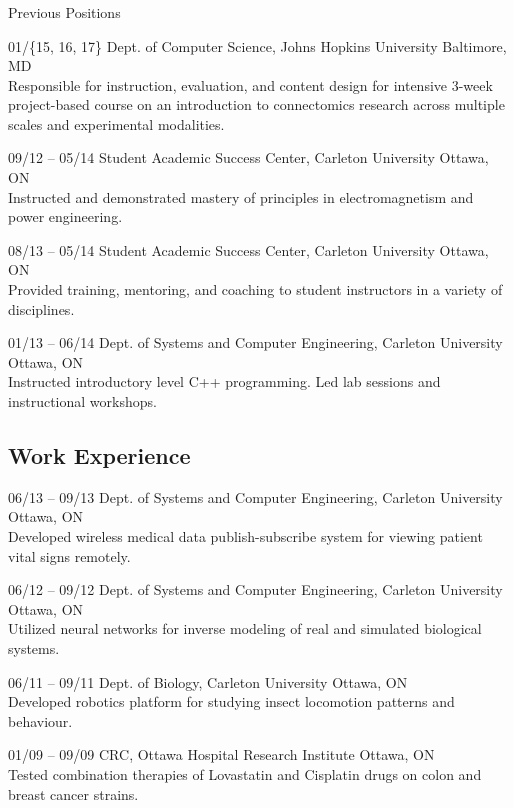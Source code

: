 \documentclass[]{friggeri-cv} %
\begin{document}
\subsubsection{}{Previous Positions}

\begin{entrylist}
\entry
{01/\{15, 16, 17\}}
{Dept. of Computer Science, Johns Hopkins University}
{Baltimore, MD}
{\\
Responsible for instruction, evaluation, and content design for intensive 3-week project-based course
on an introduction to connectomics research across multiple scales and experimental modalities.}

\entry
{09/12 -- 05/14}
{Student Academic Success Center, Carleton University}
{Ottawa, ON}
{\\
Instructed and demonstrated mastery of principles in electromagnetism and power engineering.}

\entry
{08/13 -- 05/14}
{Student Academic Success Center, Carleton University}
{Ottawa, ON}
{\\
Provided training, mentoring, and coaching to student instructors in a variety of disciplines.}

\entry
{01/13 -- 06/14}
{Dept. of Systems and Computer Engineering, Carleton University}
{Ottawa, ON}
{\\
Instructed introductory level C++ programming. Led lab sessions and instructional workshops.}
\end{entrylist}

\subsection{Work Experience}

\begin{entrylist}
\entry
{06/13 -- 09/13}
{Dept. of Systems and Computer Engineering, Carleton University}
{Ottawa, ON}
{\\
Developed wireless medical data publish-subscribe system for viewing patient vital signs remotely.}

\entry
{06/12 -- 09/12}
{Dept. of Systems and Computer Engineering, Carleton University}
{Ottawa, ON}
{\\
Utilized neural networks for inverse modeling of real and simulated biological systems.}

\entry
{06/11 -- 09/11}
{Dept. of Biology, Carleton University}
{Ottawa, ON}
{\\
Developed robotics platform for studying insect locomotion patterns and behaviour.}

\entry
{01/09 -- 09/09}
{CRC, Ottawa Hospital Research Institute}
{Ottawa, ON}
{\\
Tested combination therapies of Lovastatin and Cisplatin drugs on colon and breast cancer strains.}
\end{entrylist}
\end{document}
